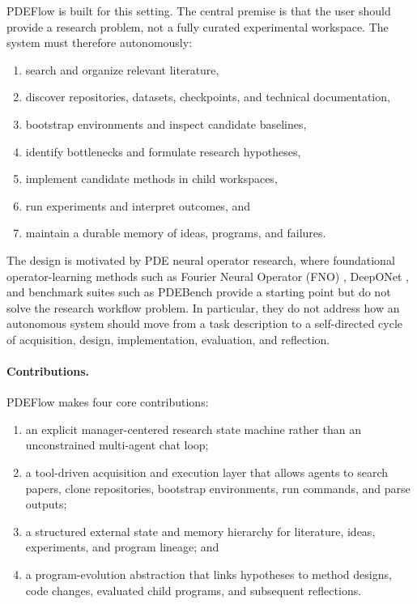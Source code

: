 \documentclass[11pt]{article}
\begin{document}
PDEFlow is built for this setting. The central premise is that the user should provide a research problem, not a fully curated experimental workspace. The system must therefore autonomously:
\begin{enumerate}[leftmargin=1.5em]
  \item search and organize relevant literature,
  \item discover repositories, datasets, checkpoints, and technical documentation,
  \item bootstrap environments and inspect candidate baselines,
  \item identify bottlenecks and formulate research hypotheses,
  \item implement candidate methods in child workspaces,
  \item run experiments and interpret outcomes, and
  \item maintain a durable memory of ideas, programs, and failures.
\end{enumerate}

The design is motivated by PDE neural operator research, where foundational operator-learning methods such as Fourier Neural Operator (FNO) \cite{li2020fno}, DeepONet \cite{lu2021deeponet}, and benchmark suites such as PDEBench \cite{takamoto2022pdebench} provide a starting point but do not solve the research workflow problem. In particular, they do not address how an autonomous system should move from a task description to a self-directed cycle of acquisition, design, implementation, evaluation, and reflection.

\paragraph{Contributions.}
PDEFlow makes four core contributions:
\begin{enumerate}[leftmargin=1.5em]
  \item an explicit manager-centered research state machine rather than an unconstrained multi-agent chat loop;
  \item a tool-driven acquisition and execution layer that allows agents to search papers, clone repositories, bootstrap environments, run commands, and parse outputs;
  \item a structured external state and memory hierarchy for literature, ideas, experiments, and program lineage; and
  \item a program-evolution abstraction that links hypotheses to method designs, code changes, evaluated child programs, and subsequent reflections.
\end{enumerate}
\end{document}
